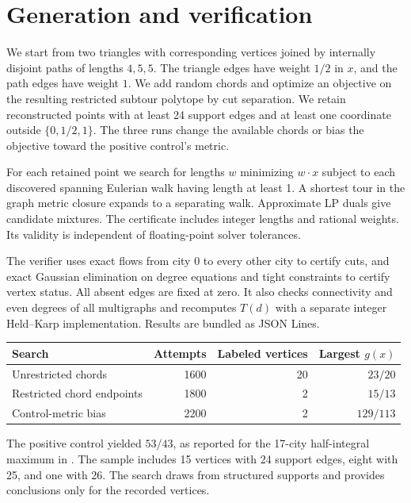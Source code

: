 \documentclass[11pt]{article}
\begin{document}
\newpage
\section{Generation and verification}
We start from two triangles with corresponding vertices joined by
internally disjoint paths of lengths \(4,5,5\). The triangle edges
have weight \(1/2\) in \(x\), and the path edges have weight \(1\).
We add random chords and optimize an objective on the resulting
restricted subtour polytope by cut separation. We retain reconstructed
points with at least 24 support edges and at least one coordinate
outside \(\{0,1/2,1\}\). The three runs change the available chords or
bias the objective toward the positive control's metric.

For each retained point we search for lengths \(w\) minimizing
\(w\cdot x\) subject to each discovered spanning Eulerian walk having
length at least 1. A shortest tour in the graph metric closure expands
to a separating walk. Approximate LP duals give candidate mixtures.
The certificate includes integer lengths and rational weights. Its
validity is independent of floating-point solver tolerances.

The verifier uses exact flows from city 0 to every other city to
certify cuts, and exact Gaussian elimination on degree equations
and tight constraints to certify vertex status. All absent edges
are fixed at zero. It also checks connectivity and even degrees
of all multigraphs and recomputes \(T(d)\) with a separate integer
Held--Karp implementation. Results are bundled as JSON Lines.

\begin{center}
\begin{tabular}{lrrr}
\toprule
Search & Attempts & Labeled vertices & Largest \(g(x)\) \\
\midrule
Unrestricted chords & 1600 & 20 & \(23/20\) \\
Restricted chord endpoints & 1800 & 2 & \(15/13\) \\
Control-metric bias & 2200 & 2 & \(129/113\) \\
\bottomrule
\end{tabular}
\end{center}

The positive control yielded \(53/43\), as reported for the
17-city half-integral maximum in \cite{chp}. The sample includes
15 vertices with 24 support edges, eight with 25, and one with 26.
The search draws from structured supports and provides conclusions
only for the recorded vertices.
\end{document}
